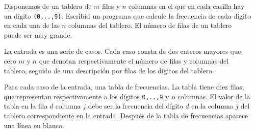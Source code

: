 

\Statement

Disponemos de un tablero de $m$ filas y $n$ columnas en el que en cada casilla hay un dígito {\tt (0,..,9)}. Escribid un programa que calcule la frecuencia de cada dígito en cada una de las $n$ columnas del tablero. El número de filas de un tablero puede ser muy grande.

\Input

La entrada es una serie de casos. Cada caso consta de dos enteros mayores que cero $m$ y $n$ que denotan respectivamente el número de filas y columnas del tablero, seguido de una descripción por filas de los dígitos del tablero.

\Output

Para cada caso de la entrada, una tabla de frecuencias. La tabla tiene diez filas, que representan respectivamente a los dígitos {\tt 0,..,9} y $n$ columnas. El valor de la tabla en la fila $d$ columna $j$ debe ser la frecuencia del dígito $d$ en la columna $j$ del tablero correspondiente en la entrada. Después de la tabla de frecuencias aparece una línea en blanco.

\Sample
